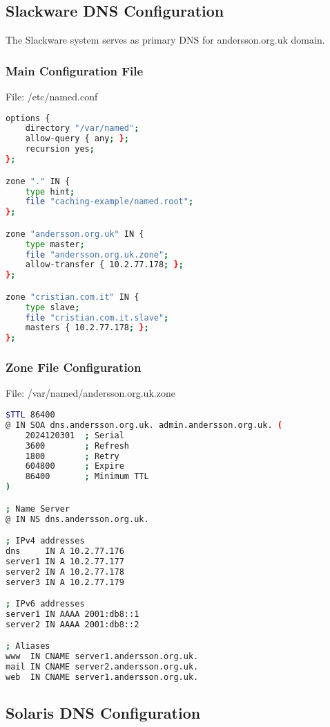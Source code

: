 \documentclass[12pt,a4paper]{article}
\begin{document}
\subsection{Slackware DNS Configuration}

The Slackware system serves as primary DNS for andersson.org.uk domain.

\subsubsection{Main Configuration File}
File: /etc/named.conf

\begin{lstlisting}[language=bash]
options {
    directory "/var/named";
    allow-query { any; };
    recursion yes;
};

zone "." IN {
    type hint;
    file "caching-example/named.root";
};

zone "andersson.org.uk" IN {
    type master;
    file "andersson.org.uk.zone";
    allow-transfer { 10.2.77.178; };
};

zone "cristian.com.it" IN {
    type slave;
    file "cristian.com.it.slave";
    masters { 10.2.77.178; };
};
\end{lstlisting}

\subsubsection{Zone File Configuration}
File: /var/named/andersson.org.uk.zone

\begin{lstlisting}[language=bash]
$TTL 86400
@ IN SOA dns.andersson.org.uk. admin.andersson.org.uk. (
    2024120301  ; Serial
    3600        ; Refresh
    1800        ; Retry
    604800      ; Expire
    86400       ; Minimum TTL
)

; Name Server
@ IN NS dns.andersson.org.uk.

; IPv4 addresses
dns     IN A 10.2.77.176
server1 IN A 10.2.77.177
server2 IN A 10.2.77.178
server3 IN A 10.2.77.179

; IPv6 addresses
server1 IN AAAA 2001:db8::1
server2 IN AAAA 2001:db8::2

; Aliases
www  IN CNAME server1.andersson.org.uk.
mail IN CNAME server2.andersson.org.uk.
web  IN CNAME server1.andersson.org.uk.
\end{lstlisting}

\subsection{Solaris DNS Configuration}
\end{document}
